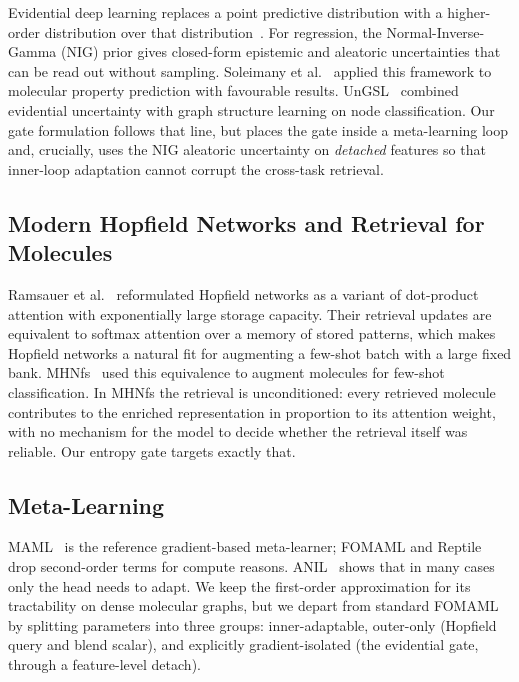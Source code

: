 \documentclass{article}
\theoremstyle{plain}
\theoremstyle{definition}
\theoremstyle{remark}
\begin{document}
Evidential deep learning replaces a point predictive distribution with a higher-order distribution over that distribution~\citep{amini2020deep,sensoy2018evidential}. For regression, the Normal-Inverse-Gamma (NIG) prior gives closed-form epistemic and aleatoric uncertainties that can be read out without sampling. Soleimany et al.~\citep{soleimany2021evidential} applied this framework to molecular property prediction with favourable results. UnGSL~\citep{han2025ungsl} combined evidential uncertainty with graph structure learning on node classification. Our gate formulation follows that line, but places the gate inside a meta-learning loop and, crucially, uses the NIG aleatoric uncertainty on \emph{detached} features so that inner-loop adaptation cannot corrupt the cross-task retrieval.

\subsection{Modern Hopfield Networks and Retrieval for Molecules}

Ramsauer et al.~\citep{ramsauer2021hopfield} reformulated Hopfield networks as a variant of dot-product attention with exponentially large storage capacity. Their retrieval updates are equivalent to softmax attention over a memory of stored patterns, which makes Hopfield networks a natural fit for augmenting a few-shot batch with a large fixed bank. MHNfs~\citep{schimunek2024mhnfs} used this equivalence to augment molecules for few-shot classification. In MHNfs the retrieval is unconditioned: every retrieved molecule contributes to the enriched representation in proportion to its attention weight, with no mechanism for the model to decide whether the retrieval itself was reliable. Our entropy gate targets exactly that.

\subsection{Meta-Learning}

MAML~\citep{finn2017maml} is the reference gradient-based meta-learner; FOMAML and Reptile~\citep{nichol2018reptile} drop second-order terms for compute reasons. ANIL~\citep{raghu2020rapid} shows that in many cases only the head needs to adapt. We keep the first-order approximation for its tractability on dense molecular graphs, but we depart from standard FOMAML by splitting parameters into three groups: inner-adaptable, outer-only (Hopfield query and blend scalar), and explicitly gradient-isolated (the evidential gate, through a feature-level detach).
\end{document}
